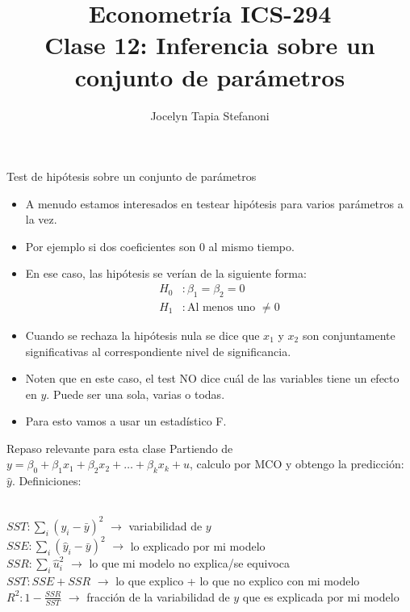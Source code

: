 \documentclass{beamer}
\title[ICS-162]{Econometría ICS-294\\ \small{Clase 12: Inferencia sobre un conjunto de parámetros}}
\author{Jocelyn Tapia Stefanoni}
\institute[USM]
{Universidad Técnica Federico Santa María\\ %
	\medskip
	\textit{} %
	
}
\date{}
\begin{document}
	
\begin{frame}
	\titlepage %


\end{frame}
\logo{}

\begin{frame}[shrink=10]{Test de hipótesis sobre un conjunto de parámetros}
    \begin{itemize}
        \item A menudo estamos interesados en testear hipótesis para varios parámetros a la vez.
        
        \item Por ejemplo si dos coeficientes son 0 al mismo tiempo.
        \item En ese caso, las hipótesis se verían de la siguiente forma:
        \begin{align*}
            H_0 & : \beta_{\text{1}} = \beta_{\text{2}} = 0 \\
            H_1 & :  \text{Al menos uno }\neq 0
        \end{align*}
        \item Cuando se rechaza la hipótesis nula se dice que $x_1$ y $x_2$ son conjuntamente significativas al correspondiente nivel de significancia.
        \item Noten que en este caso, el test NO dice cuál de las variables tiene un efecto en \( y \). Puede ser una sola, varias o todas.
        \item Para esto vamos a usar un estadístico F.
    \end{itemize}
\end{frame}

\begin{frame}{Repaso relevante para esta clase}
    Partiendo de \( y = \beta_0 + \beta_1 x_1 + \beta_2 x_2 + \ldots + \beta_k x_k + u \), calculo por MCO y obtengo la predicción: \( \hat{y} \). Definiciones:
    \begin{center}
        \\\( SST : \sum_i (y_i - \bar{y})^2 \) $\rightarrow$ variabilidad de \( y \)
        \\\( SSE : \sum_i (\hat{y}_i - \bar{y})^2 \) $\rightarrow$ lo explicado por mi modelo
        \\\( SSR : \sum_i \hat{u}_i^2 \) $\rightarrow$ lo que mi modelo no explica/se equivoca
        \\\( SST : SSE + SSR \) $\rightarrow$ lo que explico + lo que no explico con mi modelo
        \\\( R^2 : 1 - \frac{SSR}{SST} \) $\rightarrow$   fracción de la  variabilidad de \( y \) que es explicada por mi modelo
    \end{center}
\end{frame}
\end{document}

